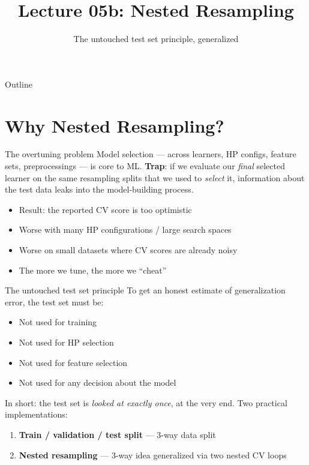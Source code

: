 \documentclass[aspectratio=169]{beamer}
\title{Lecture 05b: Nested Resampling}
\subtitle{The untouched test set principle, generalized}
\date{}
\begin{document}
\begin{frame}{Outline}
  \tableofcontents
\end{frame}

\section{Why Nested Resampling?}

\begin{frame}{The overtuning problem}
  Model selection — across learners, HP configs, feature sets, preprocessings — is core to ML.
  \vfill
  \textbf{Trap}: if we evaluate our \emph{final} selected learner on the same resampling splits that we used to \emph{select} it, information about the test data leaks into the model-building process.
  \vfill
  \begin{itemize}
    \item Result: the reported CV score is too optimistic
    \item Worse with many HP configurations / large search spaces
    \item Worse on small datasets where CV scores are already noisy
    \item The more we tune, the more we ``cheat''
  \end{itemize}
\end{frame}

\begin{frame}{The untouched test set principle}
  To get an honest estimate of generalization error, the test set must be:
  \begin{itemize}
    \item Not used for training
    \item Not used for HP selection
    \item Not used for feature selection
    \item Not used for any decision about the model
  \end{itemize}
  \vfill
  In short: the test set is \emph{looked at exactly once}, at the very end.
  \vfill
  Two practical implementations:
  \begin{enumerate}
    \item \textbf{Train / validation / test split} — 3-way data split
    \item \textbf{Nested resampling} — 3-way idea generalized via two nested CV loops
  \end{enumerate}
\end{frame}
\end{document}
